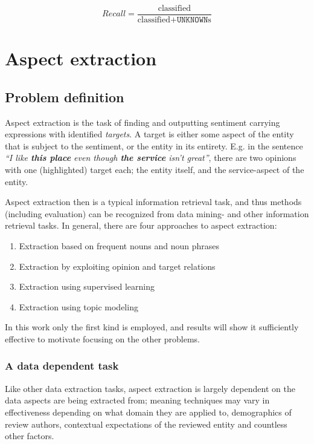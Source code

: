 \documentclass[a4paper,11pt]{kth-mag}
\begin{document}
\begin{equation} \label{eq:recall}
Recall = \frac{\text {classified}}{\text{classified} + \texttt{UNKNOWN}\text{s}}
\end{equation}







\chapter{Aspect extraction}

\section{Problem definition}
Aspect extraction is the task of finding and outputting sentiment carrying expressions
with identified \emph{targets}. A target is either some aspect of the entity that is
subject to the sentiment, or the entity in its entirety. E.g. in the sentence
\emph{``I like \textbf{this place} even though \textbf{the service} isn't great''},
there are two opinions with one (highlighted) target each; the entity itself, and the
service-aspect of the entity.

Aspect extraction then is a typical information retrieval task, and thus methods
(including evaluation) can be recognized from data mining- and other information retrieval tasks.
In general, there are four approaches to aspect extraction\cite[chapter 5.3]{liu2012sentiment}:

\begin{enumerate}
\item Extraction based on frequent nouns and noun phrases
\item Extraction by exploiting opinion and target relations
\item Extraction using supervised learning
\item Extraction using topic modeling
\end{enumerate}
In this work only the first kind is employed, and results will show it sufficiently
effective to motivate focusing on the other problems.

\subsection{A data dependent task}
Like other data extraction tasks, aspect extraction is largely dependent on the data
aspects are being extracted from; meaning techniques may vary in effectiveness depending
on what domain they are applied to, demographics of review authors,
contextual expectations of the reviewed entity and countless other factors.
\end{document}
